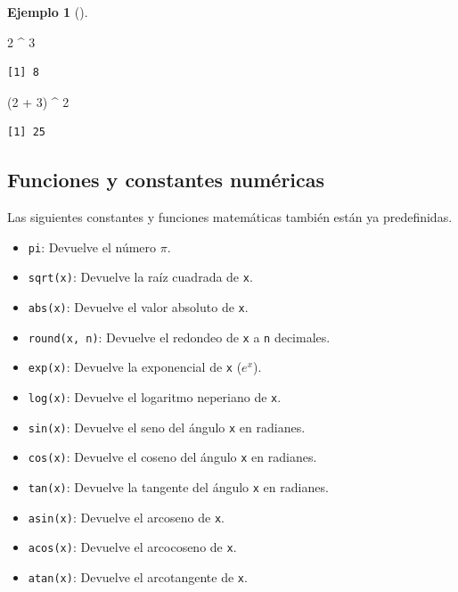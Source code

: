 \documentclass[
  spanish,
  a4paper,
]{scrreport}
\newenvironment{Shaded}{\begin{snugshade}}{\end{snugshade}}
\newcommand{\DecValTok}[1]{\textcolor[rgb]{0.68,0.00,0.00}{#1}}
\newcommand{\NormalTok}[1]{\textcolor[rgb]{0.00,0.23,0.31}{#1}}
\newcommand{\SpecialCharTok}[1]{\textcolor[rgb]{0.37,0.37,0.37}{#1}}
\providecommand{\tightlist}{%
  \setlength{\itemsep}{0pt}\setlength{\parskip}{0pt}}
\theoremstyle{definition}
\theoremstyle{definition}
\newtheorem{example}{Ejemplo}[chapter]
\theoremstyle{remark}
\begin{document}
\begin{example}[]
\begin{Shaded}
\begin{Highlighting}[]
\DecValTok{2} \SpecialCharTok{\^{}} \DecValTok{3}
\end{Highlighting}
\end{Shaded}

\begin{verbatim}
[1] 8
\end{verbatim}

\begin{Shaded}
\begin{Highlighting}[]
\NormalTok{(}\DecValTok{2} \SpecialCharTok{+} \DecValTok{3}\NormalTok{) }\SpecialCharTok{\^{}} \DecValTok{2}
\end{Highlighting}
\end{Shaded}

\begin{verbatim}
[1] 25
\end{verbatim}

\end{example}

\subsection{Funciones y constantes
numéricas}\label{funciones-y-constantes-numuxe9ricas}

Las siguientes constantes y funciones matemáticas también están ya
predefinidas.

\begin{itemize}
\tightlist
\item
  \texttt{pi}: Devuelve el número \(\pi\).
\item
  \texttt{sqrt(x)}: Devuelve la raíz cuadrada de \texttt{x}.
\item
  \texttt{abs(x)}: Devuelve el valor absoluto de \texttt{x}.
\item
  \texttt{round(x,\ n)}: Devuelve el redondeo de \texttt{x} a \texttt{n}
  decimales.
\item
  \texttt{exp(x)}: Devuelve la exponencial de \texttt{x} (\(e^x\)).
\item
  \texttt{log(x)}: Devuelve el logaritmo neperiano de \texttt{x}.
\item
  \texttt{sin(x)}: Devuelve el seno del ángulo \texttt{x} en radianes.
\item
  \texttt{cos(x)}: Devuelve el coseno del ángulo \texttt{x} en radianes.
\item
  \texttt{tan(x)}: Devuelve la tangente del ángulo \texttt{x} en
  radianes.
\item
  \texttt{asin(x)}: Devuelve el arcoseno de \texttt{x}.
\item
  \texttt{acos(x)}: Devuelve el arcocoseno de \texttt{x}.
\item
  \texttt{atan(x)}: Devuelve el arcotangente de \texttt{x}.
\end{itemize}
\end{document}
